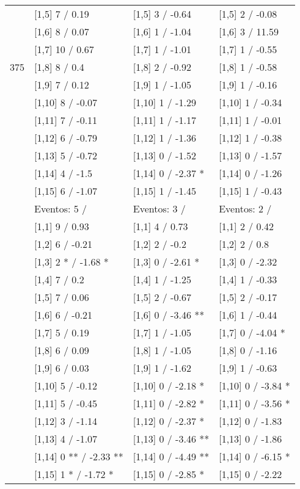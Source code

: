 \begin{table}
\begin{tabular}[t]{llll}
 & {}[1,5] 7  / 0.19 & {}[1,5] 3  / -0.64 & {}[1,5] 2  / -0.08\\
 & {}[1,6] 8  / 0.07 & {}[1,6] 1  / -1.04 & {}[1,6] 3  / 11.59\\
 & {}[1,7] 10  / 0.67 & {}[1,7] 1  / -1.01 & {}[1,7] 1  / -0.55\\
375 & {}[1,8] 8  / 0.4 & {}[1,8] 2  / -0.92 & {}[1,8] 1  / -0.58\\
\addlinespace
 & {}[1,9] 7  / 0.12 & {}[1,9] 1  / -1.05 & {}[1,9] 1  / -0.16\\
 & {}[1,10] 8  / -0.07 & {}[1,10] 1  / -1.29 & {}[1,10] 1  / -0.34\\
 & {}[1,11] 7  / -0.11 & {}[1,11] 1  / -1.17 & {}[1,11] 1  / -0.01\\
 & {}[1,12] 6  / -0.79 & {}[1,12] 1  / -1.36 & {}[1,12] 1  / -0.38\\
 & {}[1,13] 5  / -0.72 & {}[1,13] 0  / -1.52 & {}[1,13] 0  / -1.57\\
\addlinespace
 & {}[1,14] 4  / -1.5 & {}[1,14] 0  / -2.37 * & {}[1,14] 0  / -1.26\\
 & {}[1,15] 6  / -1.07 & {}[1,15] 1  / -1.45 & {}[1,15] 1  / -0.43\\
 & Eventos:  5 / & Eventos:  3 / & Eventos:  2 /\\
 & {}[1,1] 9  / 0.93 & {}[1,1] 4  / 0.73 & {}[1,1] 2  / 0.42\\
 & {}[1,2] 6  / -0.21 & {}[1,2] 2  / -0.2 & {}[1,2] 2  / 0.8\\
\addlinespace
 & {}[1,3] 2 * / -1.68 * & {}[1,3] 0  / -2.61 * & {}[1,3] 0  / -2.32\\
 & {}[1,4] 7  / 0.2 & {}[1,4] 1  / -1.25 & {}[1,4] 1  / -0.33\\
 & {}[1,5] 7  / 0.06 & {}[1,5] 2  / -0.67 & {}[1,5] 2  / -0.17\\
 & {}[1,6] 6  / -0.21 & {}[1,6] 0  / -3.46 ** & {}[1,6] 1  / -0.44\\
 & {}[1,7] 5  / 0.19 & {}[1,7] 1  / -1.05 & {}[1,7] 0  / -4.04 *\\
\addlinespace
500 & {}[1,8] 6  / 0.09 & {}[1,8] 1  / -1.05 & {}[1,8] 0  / -1.16\\
 & {}[1,9] 6  / 0.03 & {}[1,9] 1  / -1.62 & {}[1,9] 1  / -0.63\\
 & {}[1,10] 5  / -0.12 & {}[1,10] 0  / -2.18 * & {}[1,10] 0  / -3.84 *\\
 & {}[1,11] 5  / -0.45 & {}[1,11] 0  / -2.82 * & {}[1,11] 0  / -3.56 *\\
 & {}[1,12] 3  / -1.14 & {}[1,12] 0  / -2.37 * & {}[1,12] 0  / -1.83\\
\addlinespace
 & {}[1,13] 4  / -1.07 & {}[1,13] 0  / -3.46 ** & {}[1,13] 0  / -1.86\\
 & {}[1,14] 0 ** / -2.33 ** & {}[1,14] 0  / -4.49 ** & {}[1,14] 0  / -6.15 *\\
 & {}[1,15] 1 * / -1.72 * & {}[1,15] 0  / -2.85 * & {}[1,15] 0  / -2.22\\
\bottomrule
\end{tabular}
\end{table}
